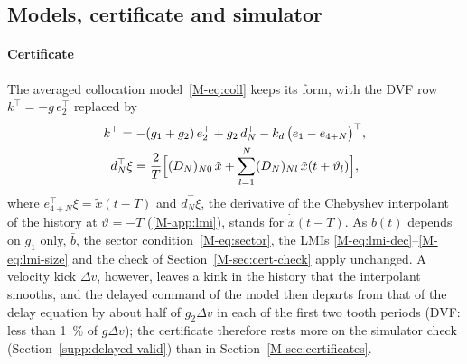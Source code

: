 \subsection{Models, certificate and simulator}\label{supp:delayed-model}

\paragraph{Certificate}
The averaged collocation model~\eqref{M-eq:coll} keeps its form, with the DVF row $k^\top=-g\,e_2^\top$ replaced by
\begin{equation*}
  \begin{gathered}
    k^\top=-(g_1+g_2)\,e_2^\top+g_2\,d_N^\top-k_d\,\bigl(e_1-e_{4+N}\bigr)^\top,\\
    d_N^\top\xi=\frac2T\Bigl[(D_N)_{N0}\,\tilde x+\sum_{l=1}^{N}(D_N)_{Nl}\,\tilde x(t+\vartheta_l)\Bigr],
  \end{gathered}
\end{equation*}
where $e_{4+N}^\top\xi=\tilde x(t-T)$ and $d_N^\top\xi$, the derivative of the Chebyshev interpolant of the history at $\vartheta=-T$ (\ref{M-app:lmi}), stands for $\dot{\tilde x}(t-T)$. As $b(t)$ depends on $g_1$ only, $\bar b$, the sector condition~\eqref{M-eq:sector}, the LMIs \eqref{M-eq:lmi-dec}--\eqref{M-eq:lmi-size} and the check of Section~\ref{M-sec:cert-check} apply unchanged. A velocity kick $\Delta v$, however, leaves a kink in the history that the interpolant smooths, and the delayed command of the model then departs from that of the delay equation by about half of $g_2\Delta v$ in each of the first two tooth periods (DVF: less than \SI{1}{\percent} of $g\Delta v$); the certificate therefore rests more on the simulator check (Section~\ref{supp:delayed-valid}) than in Section~\ref{M-sec:certificates}.

